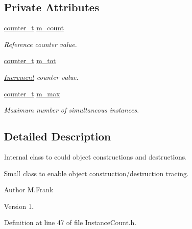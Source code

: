 \subsection*{Private Attributes}
\begin{DoxyCompactItemize}
\item 
\hyperlink{struct_d_d4hep_1_1_instance_count_ae81dc0c76b135425e14b6dc38262a727}{counter\+\_\+t} \hyperlink{class_d_d4hep_1_1_instance_count_1_1_counter_add94845aa9120ee3daa350d46f2ee919}{m\+\_\+count}
\begin{DoxyCompactList}\small\item\em Reference counter value. \end{DoxyCompactList}\item 
\hyperlink{struct_d_d4hep_1_1_instance_count_ae81dc0c76b135425e14b6dc38262a727}{counter\+\_\+t} \hyperlink{class_d_d4hep_1_1_instance_count_1_1_counter_aecd05cbfb249522b056b6e0c7f163c63}{m\+\_\+tot}
\begin{DoxyCompactList}\small\item\em \hyperlink{struct_d_d4hep_1_1_increment}{Increment} counter value. \end{DoxyCompactList}\item 
\hyperlink{struct_d_d4hep_1_1_instance_count_ae81dc0c76b135425e14b6dc38262a727}{counter\+\_\+t} \hyperlink{class_d_d4hep_1_1_instance_count_1_1_counter_a037706f44071d417950579ff8627732b}{m\+\_\+max}
\begin{DoxyCompactList}\small\item\em Maximum number of simultaneous instances. \end{DoxyCompactList}\end{DoxyCompactItemize}


\subsection{Detailed Description}
Internal class to could object constructions and destructions. 

Small class to enable object construction/destruction tracing.

\begin{DoxyAuthor}{Author}
M.\+Frank 
\end{DoxyAuthor}
\begin{DoxyVersion}{Version}
1. 
\end{DoxyVersion}


Definition at line 47 of file Instance\+Count.\+h.



